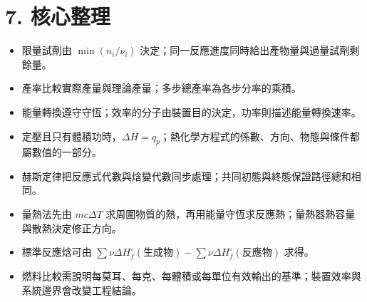 \documentclass[11pt,a4paper]{article}
\providecommand{\tightlist}{%
  \setlength{\itemsep}{0pt}\setlength{\parskip}{0pt}}
\begin{document}
\section{7. 核心整理}\label{ux6838ux5fc3ux6574ux7406}

\begin{itemize}
\tightlist
\item
  限量試劑由 \(\min(n_i/\nu_i)\) 決定；同一反應進度同時給出產物量與過量試劑剩餘量。
\item
  產率比較實際產量與理論產量；多步總產率為各步分率的乘積。
\item
  能量轉換遵守守恆；效率的分子由裝置目的決定，功率則描述能量轉換速率。
\item
  定壓且只有體積功時，\(\Delta H=q_p\)；熱化學方程式的係數、方向、物態與條件都屬數值的一部分。
\item
  赫斯定律把反應式代數與焓變代數同步處理；共同初態與終態保證路徑總和相同。
\item
  量熱法先由 \(mc\Delta T\) 求周圍物質的熱，再用能量守恆求反應熱；量熱器熱容量與散熱決定修正方向。
\item
  標準反應焓可由 \(\sum\nu\Delta H_f^\circ(\text{生成物})-\sum\nu\Delta H_f^\circ(\text{反應物})\) 求得。
\item
  燃料比較需說明每莫耳、每克、每體積或每單位有效輸出的基準；裝置效率與系統邊界會改變工程結論。
\end{itemize}
\end{document}
